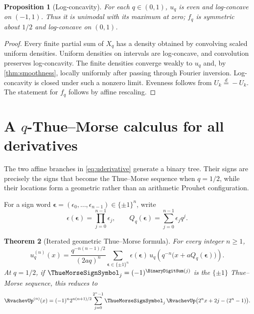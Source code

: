 \documentclass[11pt,oneside]{article}
\newtheorem{theorem}{Theorem}[section]
\newtheorem{proposition}[theorem]{Proposition}
\theoremstyle{definition}
\theoremstyle{remark}
\begin{document}
\begin{proposition}[Log-concavity]
For each $q\in(0,1)$, $u_q$ is even and log-concave on $(-1,1)$.  Thus it is unimodal
with its maximum at zero; $f_q$ is symmetric about $1/2$ and log-concave on $(0,1)$.
\end{proposition}

\begin{proof}
Every finite partial sum of $X_q$ has a density obtained by convolving scaled uniform
densities.  Uniform densities on intervals are log-concave, and convolution preserves
log-concavity.  The finite densities converge weakly to $u_q$ and, by
\cref{thm:smoothness}, locally uniformly after passing through Fourier inversion.
Log-concavity is closed under such a nonzero limit.  Evenness follows from
$U_k\overset d=-U_k$.  The statement for $f_q$ follows by affine rescaling.
\end{proof}

\section{A $q$-Thue--Morse calculus for all derivatives}
\label{sec:qthue}

The two affine branches in \eqref{eq:uderivative} generate a binary tree.  Their signs
are precisely the signs that become the Thue--Morse sequence when $q=1/2$, while their
locations form a geometric rather than an arithmetic Prouhet configuration.

For a sign word $\boldsymbol\epsilon=(\epsilon_0,\dots,\epsilon_{n-1})\in\{\pm1\}^n$,
write
\[
 \epsilon(\boldsymbol\epsilon)=\prod_{j=0}^{n-1}\epsilon_j,
 \qquad
 Q_q(\boldsymbol\epsilon)=\sum_{j=0}^{n-1}\epsilon_jq^j.
\]

\begin{theorem}[Iterated geometric Thue--Morse formula]
\label{thm:qthue-derivative}
For every integer $n\ge1$,
\begin{equation}
 u_q^{(n)}(x)=
 \frac{q^{-n(n-1)/2}}{(2aq)^n}
 \sum_{\boldsymbol\epsilon\in\{\pm1\}^n}
 \epsilon(\boldsymbol\epsilon)\,
 u_q\!\left(q^{-n}\bigl(x+aQ_q(\boldsymbol\epsilon)\bigr)\right).
 \label{eq:qthue-derivative}
\end{equation}
At $q=1/2$, if $\ThueMorseSignSymbol_j=(-1)^{\BinaryDigitSum(j)}$ is the $\{\pm1\}$ Thue--Morse sequence, this
reduces to
\begin{equation}
 \RvachevUp^{(n)}(x)=(-1)^n2^{n(n+1)/2}
 \sum_{j=0}^{2^n-1}\ThueMorseSignSymbol_j\,
 \RvachevUp\bigl(2^nx+2j-(2^n-1)\bigr).
 \label{eq:classical-thue-derivative}
\end{equation}
\end{theorem}
\end{document}
